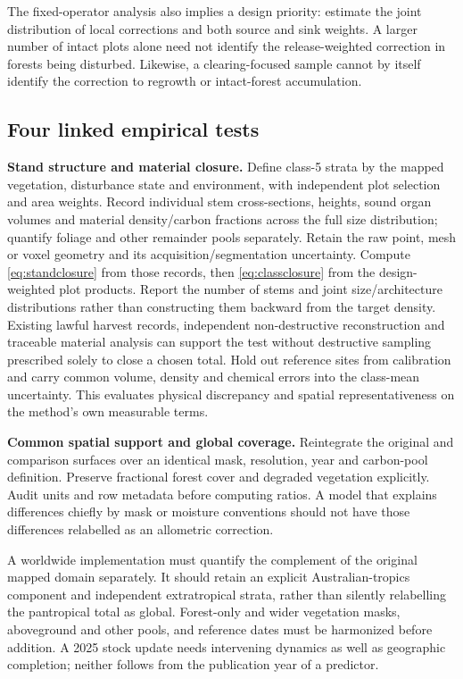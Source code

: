 \documentclass[11pt,a4paper]{article}
\theoremstyle{remark}
\begin{document}
The fixed-operator analysis also implies a design priority: estimate the joint distribution of local corrections and both source and sink weights. A larger number of intact plots alone need not identify the release-weighted correction in forests being disturbed. Likewise, a clearing-focused sample cannot by itself identify the correction to regrowth or intact-forest accumulation.

\subsection{Four linked empirical tests}
\textbf{Stand structure and material closure.} Define class-5 strata by the mapped vegetation, disturbance state and environment, with independent plot selection and area weights. Record individual stem cross-sections, heights, sound organ volumes and material density/carbon fractions across the full size distribution; quantify foliage and other remainder pools separately. Retain the raw point, mesh or voxel geometry and its acquisition/segmentation uncertainty. Compute \eqref{eq:standclosure} from those records, then \eqref{eq:classclosure} from the design-weighted plot products. Report the number of stems and joint size/architecture distributions rather than constructing them backward from the target density. Existing lawful harvest records, independent non-destructive reconstruction and traceable material analysis can support the test without destructive sampling prescribed solely to close a chosen total. Hold out reference sites from calibration and carry common volume, density and chemical errors into the class-mean uncertainty. This evaluates physical discrepancy and spatial representativeness on the method's own measurable terms.

\textbf{Common spatial support and global coverage.} Reintegrate the original and comparison surfaces over an identical mask, resolution, year and carbon-pool definition. Preserve fractional forest cover and degraded vegetation explicitly. Audit units and row metadata before computing ratios. A model that explains differences chiefly by mask or moisture conventions should not have those differences relabelled as an allometric correction.

A worldwide implementation must quantify the complement of the original mapped domain separately. It should retain an explicit Australian-tropics component and independent extratropical strata, rather than silently relabelling the pantropical total as global. Forest-only and wider vegetation masks, aboveground and other pools, and reference dates must be harmonized before addition. A 2025 stock update needs intervening dynamics as well as geographic completion; neither follows from the publication year of a predictor.
\end{document}
